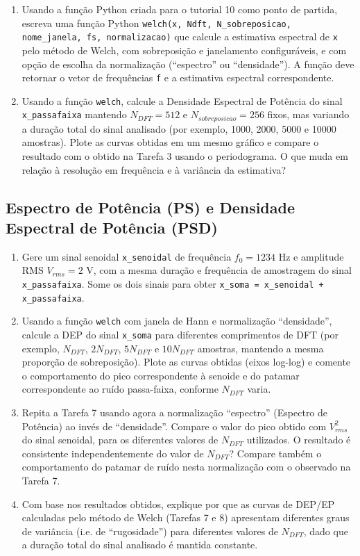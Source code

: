 \documentclass[a4paper,twoside,12pt]{article}
\begin{document}
\begin{enumerate}
		\item Usando a função Python criada para o tutorial 10 como ponto de partida, escreva uma função Python {\tt welch(x, Ndft, N\_sobreposicao, nome\_janela, fs, normalizacao)} que calcule a estimativa espectral de {\tt x} pelo método de Welch, com sobreposição e janelamento configuráveis, e com opção de escolha da normalização (``espectro'' ou ``densidade''). A função deve retornar o vetor de frequências {\tt f} e a estimativa espectral correspondente.
		
		\item Usando a função {\tt welch}, calcule a Densidade Espectral de Potência do sinal {\tt x\_passafaixa} mantendo $N_{DFT} = 512$ e $N_{sobreposicao} = 256$ fixos, mas variando a duração total do sinal analisado (por exemplo, 1000, 2000, 5000 e 10000 amostras). Plote as curvas obtidas em um mesmo gráfico e compare o resultado com o obtido na Tarefa 3 usando o periodograma. O que muda em relação à resolução em frequência e à variância da estimativa?
	\end{enumerate}
	
	
	\subsection{Espectro de Potência (PS) e Densidade Espectral de Potência (PSD)}
	
	\begin{enumerate}
		\item Gere um sinal senoidal {\tt x\_senoidal} de frequência $f_0 = 1234$ Hz e amplitude RMS $V_{rms} = 2$ V, com a mesma duração e frequência de amostragem do sinal {\tt x\_passafaixa}. Some os dois sinais para obter {\tt x\_soma = x\_senoidal + x\_passafaixa}.
		
		\item Usando a função {\tt welch} com janela de Hann e normalização ``densidade'', calcule a DEP do sinal {\tt x\_soma} para diferentes comprimentos de DFT (por exemplo, $N_{DFT}$, $2 N_{DFT}$, $5 N_{DFT}$ e $10 N_{DFT}$ amostras, mantendo a mesma proporção de sobreposição). Plote as curvas obtidas (eixos log-log) e comente o comportamento do pico correspondente à senoide e do patamar correspondente ao ruído passa-faixa, conforme $N_{DFT}$ varia.
		
		\item Repita a Tarefa 7 usando agora a normalização ``espectro'' (Espectro de Potência) ao invés de ``densidade''. Compare o valor do pico obtido com $V_{rms}^2$ do sinal senoidal, para os diferentes valores de $N_{DFT}$ utilizados. O resultado é consistente independentemente do valor de $N_{DFT}$? Compare também o comportamento do patamar de ruído nesta normalização com o observado na Tarefa 7.
		
		\item Com base nos resultados obtidos, explique por que as curvas de DEP/EP calculadas pelo método de Welch (Tarefas 7 e 8) apresentam diferentes graus de variância (i.e. de ``rugosidade'') para diferentes valores de $N_{DFT}$, dado que a duração total do sinal analisado é mantida constante.
	\end{enumerate}
	
\end{document}
